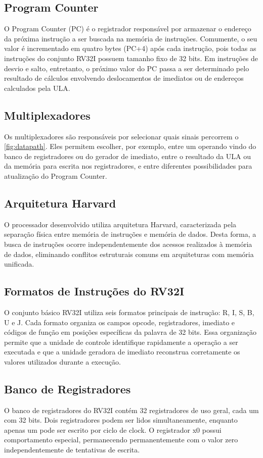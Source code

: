 \documentclass[conference]{IEEEtran}
\begin{document}
\subsection{Program Counter}
O Program Counter (PC) é o registrador responsável por armazenar o endereço da próxima instrução a ser buscada na memória de instruções. Comumente, o seu valor é incrementado em quatro bytes (PC+4) após cada instrução, pois todas as instruções do conjunto RV32I possuem tamanho fixo de 32 bits. Em instruções de desvio e salto, entretanto, o próximo valor do PC passa a ser determinado pelo resultado de cálculos envolvendo deslocamentos de imediatos ou de endereços calculados pela ULA.

\subsection{Multiplexadores}
Os multiplexadores são responsáveis por selecionar quais sinais percorrem o \ref{fig:datapath}. Eles permitem escolher, por exemplo, entre um operando vindo do banco de registradores ou do gerador de imediato, entre o resultado da ULA ou da memória para escrita nos registradores, e entre diferentes possibilidades para atualização do Program Counter.

\subsection{Arquitetura Harvard}
O processador desenvolvido utiliza arquitetura Harvard, caracterizada pela separação física entre memória de instruções e memória de dados. Desta forma, a busca de instruções ocorre independentemente dos acessos realizados à memória de dados, eliminando conflitos estruturais comuns em arquiteturas com memória unificada.

\subsection{Formatos de Instruções do RV32I}
O conjunto básico RV32I utiliza seis formatos principais de instrução: R, I, S, B, U e J. Cada formato organiza os campos opcode, registradores, imediato e códigos de função em posições específicas da palavra de 32 bits. Essa organização permite que a unidade de controle identifique rapidamente a operação a ser executada e que a unidade geradora de imediato reconstrua corretamente os valores utilizados durante a execução.


\subsection{Banco de Registradores}
O banco de registradores do RV32I contém 32 registradores de uso geral, cada um com 32 bits. Dois registradores podem ser lidos simultaneamente, enquanto apenas um pode ser escrito por ciclo de clock. O registrador x0 possui comportamento especial, permanecendo permanentemente com o valor zero independentemente de tentativas de escrita.
\end{document}
